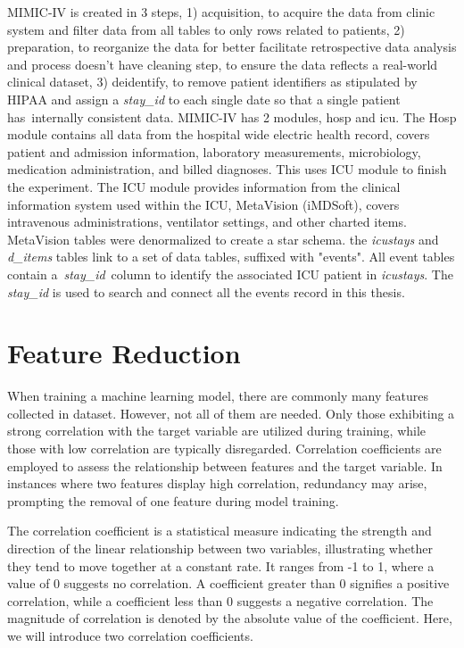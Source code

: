 \documentclass[12pt,a4paper,english
]{tunithesis}
\begin{document}
MIMIC-IV is created in 3 steps, 1) acquisition, to acquire the data from clinic system and filter data from all tables to only rows related to patients, 2) preparation, to reorganize the data for better facilitate retrospective data analysis and process doesn't have cleaning step, to ensure the data reflects a real-world clinical dataset, 3) deidentify, to remove patient identifiers as stipulated by HIPAA and assign a \textit{stay\_id} to each single date so that a single patient has internally consistent data. MIMIC-IV has 2 modules, hosp and icu. The Hosp module contains all data from the hospital wide electric health record, covers patient and admission information, laboratory measurements, microbiology, medication administration, and billed diagnoses. This uses ICU module to finish the experiment. The ICU module provides information from the clinical information system used within the ICU, MetaVision (iMDSoft), covers intravenous administrations, ventilator settings, and other charted items. MetaVision tables were denormalized to create a star schema. the \textit{icustays} and \textit{d\_items} tables link to a set of data tables,  suffixed with "events". All event tables contain a \textit{stay\_id} column to identify the associated ICU patient in \textit{icustays}. The \textit{stay\_id} is used to search and connect all the events record in this thesis. \parencite{johnson2023}

\section{Feature Reduction}
When training a machine learning model, there are commonly many features collected in dataset. However, not all of them are needed. Only those exhibiting a strong correlation with the target variable are utilized during training, while those with low correlation are typically disregarded. Correlation coefficients are employed to assess the relationship between features and the target variable. In instances where two features display high correlation, redundancy may arise, prompting the removal of one feature during model training.

The correlation coefficient is a statistical measure indicating the strength and direction of the linear relationship between two variables, illustrating whether they tend to move together at a constant rate. It ranges from -1 to 1, where a value of 0 suggests no correlation. A coefficient greater than 0 signifies a positive correlation, while a coefficient less than 0 suggests a negative correlation. The magnitude of correlation is denoted by the absolute value of the coefficient. Here, we will introduce two correlation coefficients.
\end{document}
